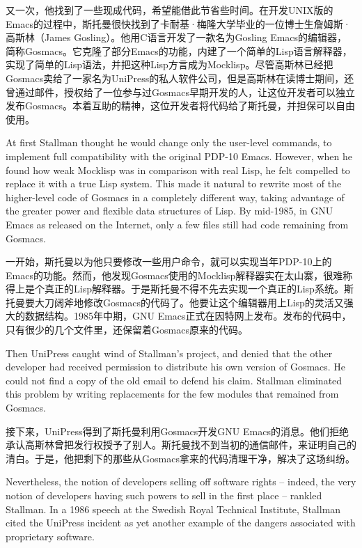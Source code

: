 \ifdefined\chs
又一次，他找到了一些现成代码，希望能借此节省些时间。在开发UNIX版的Emacs的过程中，斯托曼很快找到了卡耐基·梅隆大学毕业的一位博士生詹姆斯·高斯林（James Gosling）。他用C语言开发了一款名为Gosling Emacs的编辑器，简称Gosmacs。它克隆了部分Emacs的功能，内建了一个简单的Lisp语言解释器，实现了简单的Lisp语法，并把这种Lisp方言成为Mocklisp。尽管高斯林已经把Gosmacs卖给了一家名为UniPress的私人软件公司，但是高斯林在读博士期间，还曾通过邮件，授权给了一位参与过Gosmacs早期开发的人，让这位开发者可以独立发布Gosmacs。本着互助的精神，这位开发者将代码给了斯托曼，并担保可以自由使用。
\fi

\ifdefined\eng
At first Stallman thought he would change only the user-level commands, to implement full compatibility with the original PDP-10 Emacs.  However, when he found how weak Mocklisp was in comparison with real Lisp, he felt compelled to replace it with a true Lisp system.  This made it natural to rewrite most of the higher-level code of Gosmacs in a completely different way, taking advantage of the greater power and flexible data structures of Lisp.  By mid-1985, in GNU Emacs as released on the Internet, only a few files still had code remaining from Gosmacs.
\fi

\ifdefined\chs
一开始，斯托曼以为他只要修改一些用户命令，就可以实现当年PDP-10上的Emacs的功能。然而，他发现Gosmacs使用的Mocklisp解释器实在太山寨，很难称得上是个真正的Lisp解释器。于是斯托曼不得不先去实现一个真正的Lisp系统。斯托曼要大刀阔斧地修改Gosmacs的代码了。他要让这个编辑器用上Lisp的灵活又强大的数据结构。1985年中期，GNU Emacs正式在因特网上发布。发布的代码中，只有很少的几个文件里，还保留着Gosmacs原来的代码。
\fi

\ifdefined\eng
Then UniPress caught wind of Stallman's project, and denied that the other developer had received permission to distribute his own version of Gosmacs.  He could not find a copy of the old email to defend his claim.  Stallman eliminated this problem by writing replacements for the few modules that remained from Gosmacs.
\fi

\ifdefined\chs
接下来，UniPress得到了斯托曼利用Gosmacs开发GNU Emacs的消息。他们拒绝承认高斯林曾把发行权授予了别人。斯托曼找不到当初的通信邮件，来证明自己的清白。于是，他把剩下的那些从Gosmacs拿来的代码清理干净，解决了这场纠纷。
\fi

\ifdefined\eng
Nevertheless, the notion of developers selling off software rights -- indeed, the very notion of developers having such powers to sell in the first place -- rankled Stallman. In a 1986 speech at the Swedish Royal Technical Institute, Stallman cited the UniPress incident as yet another example of the dangers associated with proprietary software.
\fi


